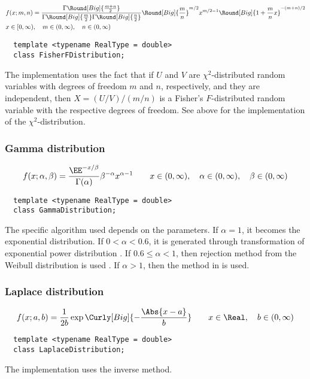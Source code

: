 \begin{align*}
  & f(x;m,n) =
  \frac{\Gamma\Round[Big]{\frac{m + n}{2}}}{
    \Gamma\Round[Big]{\frac{m}{2}}\Gamma\Round[Big]{\frac{n}{2}}}
  \Round[Big]{\frac{m}{n}}^{m/2} x^{m / 2 - 1}
  \Round[Big]{1 + \frac{m}{n}x}^{-(m + n) / 2} \\
  & x \in [0, \infty),\quad m \in (0, \infty),\quad n \in (0, \infty)
\end{align*}
\begin{Verbatim}
  template <typename RealType = double>
  class FisherFDistribution;
\end{Verbatim}
The implementation uses the fact that if $U$ and $V$ are $\chi^2$-distributed
random variables with degrees of freedom $m$ and $n$, respectively, and they
are independent, then $X = (U / V) / (m / n)$ is a Fisher's $F$-distributed
random variable with the respective degrees of freedom. See above for the
implementation of the $\chi^2$-distribution.

\subsubsection{Gamma distribution}

\begin{equation*}
  f(x;\alpha,\beta) =
  \frac{\EE^{-x/\beta}}{\Gamma(\alpha)}\beta^{-\alpha}x^{\alpha-1} \qquad
  x \in (0, \infty),\quad \alpha \in (0, \infty),\quad \beta \in (0, \infty)
\end{equation*}
\begin{Verbatim}
  template <typename RealType = double>
  class GammaDistribution;
\end{Verbatim}
The specific algorithm used depends on the parameters. If $\alpha = 1$, it
becomes the exponential distribution. If $0 < \alpha < 0.6$, it is generated
through transformation of exponential power distribution
\cite[sec~2.6]{Devroye:1986gi}. If $0.6\le\alpha<1$, then rejection method from
the Weibull distribution is used \parencite[sec.~3.4]{Devroye:1986gi}. If
$\alpha > 1$, then the method in \textcite{Marsaglia:2000vq} is used.

\subsubsection{Laplace distribution}

\begin{equation*}
  f(x;a,b) = \frac{1}{2b}\exp\Curly[Big]{-\frac{\Abs{x - a}}{b}} \qquad
  x \in \Real,\quad b \in (0, \infty)
\end{equation*}
\begin{Verbatim}
  template <typename RealType = double>
  class LaplaceDistribution;
\end{Verbatim}
The implementation uses the inverse method.

